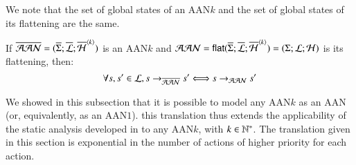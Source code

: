 We note that the set of global states of an AAN$k$
and the set of global states of its flattening are the same.

\begin{theorem}
\label{th:bisimPHP}
  If $\ov{\PH} = (\ov{\PHs}; \ov{\PHl}; \ov{\PHa}^{\angles{k}})$ is an AAN$k$
  and $\PH = \PHflat(\ov{\PHs}; \ov{\PHl}; \ov{\PHa}^{\angles{k}}) =
    (\PHs; \PHl; \PHa)$ is its flattening, then:
  \[ \forall s, s' \in \PHl, s \PHPtrans[\oPH] s' \Longleftrightarrow s \PHPtrans[\PH] s' \]
\end{theorem}

We showed in this subsection that it is possible to model any AAN$k$
as an AAN (or, equivalently, as an AAN$1$).
this translation thus extends the applicability of the static analysis developed in
 to any AAN$k$, with $k \in \sN^*$.
The translation given in this section
is exponential in the number of actions of higher priority for each action.
